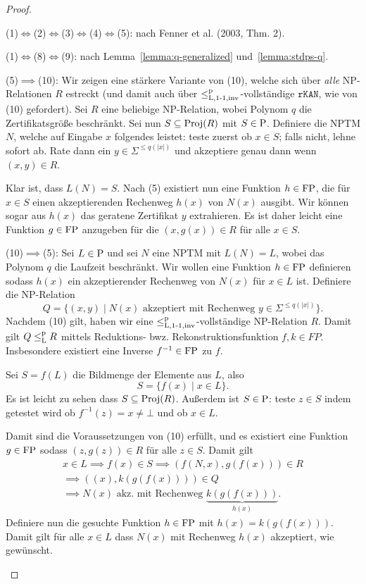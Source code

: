 \begin{proof}
\begin{prooflist}
\item (1)$\iff$(2)$\iff$(3)$\iff$(4)$\iff$(5): nach Fenner et al. (2003, Thm. 2).

\item (1)$\iff$(8)$\iff$(9): nach Lemma~\ref{lemma:q-generalized} und~\ref{lemma:stdps-q}.

\item (5)$\implies$(10): Wir zeigen eine stärkere Variante von (10), welche sich über \emph{alle} NP-Relationen $R$ estreckt (und damit auch über $\leq_\mathrm{L,1\mhyphen1,inv}^\mathrm p$-vollständige $\mathtt{rKAN}$, wie von (10) gefordert). Sei $R$ eine beliebige  NP-Relation, wobei Polynom $q$ die Zertifikatsgröße beschränkt. Sei nun $S\subseteq \Proj(R)$ mit $S\in \P$. Definiere die NPTM $N$, welche auf Eingabe $x$ folgendes leistet: teste zuerst ob $x\in S$; falls nicht, lehne sofort ab. Rate dann ein $y\in\Sigma^{\leq q(|x|)}$ und akzeptiere genau dann wenn $(x,y)\in R$. 

    Klar ist, dass $L(N)=S$. Nach (5) existiert nun eine Funktion $h\in \FP$, die für $x\in S$ einen akzeptierenden Rechenweg $h(x)$ von $N(x)$ ausgibt. Wir können sogar aus $h(x)$ das geratene Zertifikat $y$ extrahieren. Es ist daher leicht eine Funktion $g\in \FP$ anzugeben für die $(x,g(x))\in R$ für alle $x\in S$.

\item (10)$\implies$(5): Sei $L\in \P$ und sei $N$ eine NPTM mit $L(N)=L$, wobei das Polynom $q$ die Laufzeit beschränkt. Wir wollen eine Funktion $h\in\FP$ definieren sodass $h(x)$ ein akzeptierender Rechenweg von $N(x)$ für $x\in L$ ist. Definiere die NP-Relation
    \[ Q = \{ (x, y) \mid \text{$N(x)$ akzeptiert mit Rechenweg $y\in\Sigma^{\leq q(|x|)}$} \}. \]
    Nachdem (10) gilt, haben wir eine $\leq_\mathrm{L,1\mhyphen1,inv}^\mathrm p$-vollständige NP-Relation $R$. Damit gilt $Q\leqlp R$ mittels Reduktions- bwz. Rekonstruktionsfunktion $f, k\in FP$. Insbesondere existiert eine Inverse $f^{-1}\in\FP$ zu $f$.

    Sei $S=f(L)$ die Bildmenge der Elemente aus $L$, also 
    \[ S= \{f(x) \mid x\in L\}. \]
    Es ist leicht zu sehen dass $S\subseteq \Proj(R)$. Außerdem ist $S\in \P$: teste $z\in S$ indem getestet wird ob $f^{-1}(z)=x\neq\bot$ und ob $x\in L$.

    Damit sind die Voraussetzungen von (10) erfüllt, und es existiert eine Funktion $g\in \FP$ sodass $(z,g(z))\in R$ für alle $z\in S$. Damit gilt
    \begin{gather*}x\in L \implies f(x) \in S \implies (f(N,x), g(f(x)))\in R\\ \implies ((x), k(g(f(x))))\in Q\\
    \implies N(x) \text{ akz. mit Rechenweg $\underbrace{k(g(f(x)))}_{h(x)}$. }
\end{gather*}
    Definiere nun die gesuchte Funktion $h\in \FP$ mit $h(x) = k(g(f(x)))$. Damit gilt für alle $x\in L$ dass $N(x)$ mit Rechenweg $h(x)$ akzeptiert, wie gewünscht.


\end{prooflist}
\end{proof}
